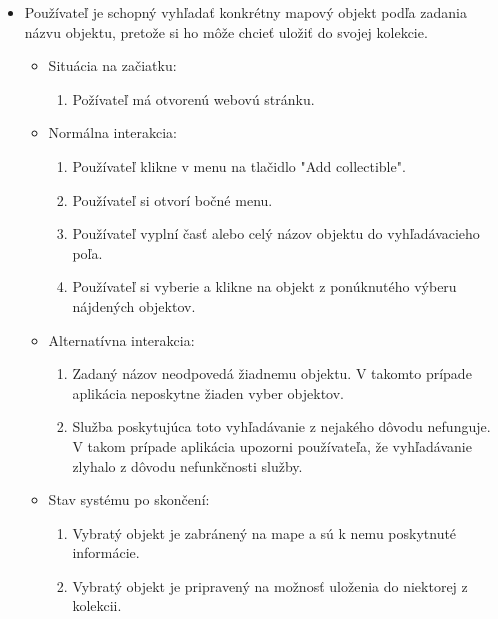 \begin{itemize}
      \item Používateľ je schopný vyhľadať konkrétny mapový objekt podľa zadania názvu objektu,
            pretože si ho môže chcieť uložiť do svojej kolekcie.
            \begin{itemize}
                  \item Situácia na začiatku:
                        \begin{enumerate}
                              \item Požívateľ má otvorenú webovú stránku.
                        \end{enumerate}
                  \item Normálna interakcia:
                        \begin{enumerate}
                              \item Používateľ klikne v menu na tlačidlo "Add collectible".
                              \item Používateľ si otvorí bočné menu.
                              \item Používateľ vyplní časť alebo celý názov objektu do vyhľadávacieho poľa.
                              \item Používateľ si vyberie a klikne na objekt z ponúknutého výberu nájdených objektov.
                        \end{enumerate}
                  \item Alternatívna interakcia:
                        \begin{enumerate}
                              \item Zadaný názov neodpovedá žiadnemu objektu. V takomto prípade aplikácia neposkytne žiaden vyber objektov.
                              \item Služba poskytujúca toto vyhľadávanie z nejakého dôvodu nefunguje. V takom prípade aplikácia upozorni používateľa, že vyhľadávanie zlyhalo z dôvodu nefunkčnosti služby.
                        \end{enumerate}
                  \item Stav systému po skončení:
                        \begin{enumerate}
                              \item Vybratý objekt je zabránený na mape a sú k nemu poskytnuté informácie.
                              \item Vybratý objekt je pripravený na možnosť uloženia do niektorej z kolekcii.
                        \end{enumerate}
            \end{itemize}


\end{itemize}

